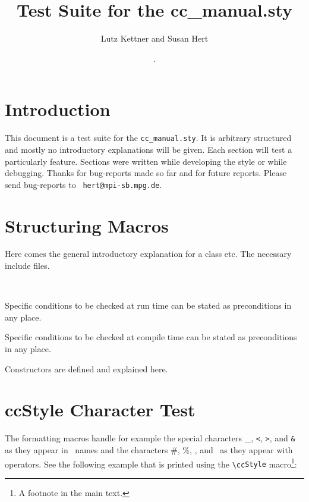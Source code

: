 \documentclass[12pt]{article}
\title {Test Suite for the cc\_manual.sty}
\author{Lutz Kettner and Susan Hert}
\date{\ccRevision. \ccDate}
\begin{document}
\maketitle

\section{Introduction}

This document is a test suite for the {\tt cc\_manual.sty}. It is
arbitrary structured and mostly no introductory explanations will be given.
Each section will test a particularly feature. Sections were written
while developing the style or while debugging. Thanks for bug-reports
made so far and for future reports. Please send bug-reports to {\tt
hert@mpi-sb.mpg.de}.


\section{Structuring Macros}

\ccDefinition Here comes the general introductory explanation for a
class etc. The necessary include files.

\\

\ccAccessFunctions

\ccPrecond Specific conditions to be checked at run time can be stated 
           as preconditions in any place.

\ccRequire Specific conditions to be checked at compile time 
           can be stated as preconditions in any place.

\ccCreation Constructors are defined and explained here.

\section{ccStyle Character Test}

The formatting macros handle for example the special characters \_,
{\tt <}, {\tt >}, and {\tt \&} as they appear in \CC\ names and the
characters \#, \%, \ccHat, and \ccTilde\ as they appear with
operators. See the following example that is printed using the
\verb+\cc+{\tt Style} macro\footnote{A footnote in the main text.}:
\end{document}
